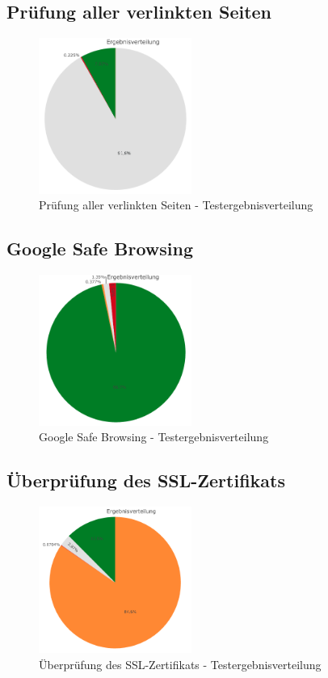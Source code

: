 \subsection{Prüfung aller verlinkten Seiten}
\begin{figure}[H]
  \centering
  \includegraphics[width=5cm]{images/stats/dialinkchecker}
  \caption{Prüfung aller verlinkten Seiten - Testergebnisverteilung}
  \label{fig:analyse-dialinkchecker}
\end{figure}

\subsection{Google Safe Browsing}
\begin{figure}[H]
  \centering
  \includegraphics[width=5cm]{images/stats/diagoogle}
  \caption{Google Safe Browsing - Testergebnisverteilung}
  \label{fig:analyse-diagoogle}
\end{figure}

\subsection{Überprüfung des SSL-Zertifikats}
\begin{figure}[H]
  \centering
  \includegraphics[width=5cm]{images/stats/diacertificate}
  \caption{Überprüfung des SSL-Zertifikats - Testergebnisverteilung}
  \label{fig:analyse-diacertificate}
\end{figure}

